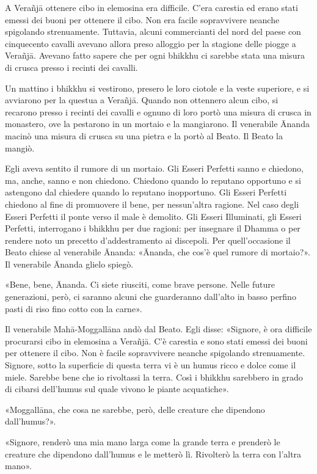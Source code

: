  A Verañjā ottenere cibo in elemosina era difficile. C’era
carestia ed erano stati emessi dei buoni per ottenere il cibo. Non era
facile sopravvivere neanche spigolando strenuamente. Tuttavia, alcuni
commercianti del nord del paese con cinquecento cavalli avevano allora
preso alloggio per la stagione delle piogge a Verañjā. Avevano fatto
sapere che per ogni bhikkhu ci sarebbe stata una misura di crusca presso
i recinti dei cavalli.


Un mattino i bhikkhu si vestirono, presero le loro ciotole e la veste
superiore, e si avviarono per la questua a Verañjā. Quando non ottennero
alcun cibo, si recarono presso i recinti dei cavalli e ognuno di loro
portò una misura di crusca in monastero, ove la pestarono in un mortaio
e la mangiarono. Il venerabile Ānanda macinò una misura di crusca su una
pietra e la portò al Beato. Il Beato la mangiò.


Egli aveva sentito il rumore di un mortaio. Gli Esseri Perfetti sanno e
chiedono, ma, anche, sanno e non chiedono. Chiedono quando lo reputano
opportuno e si astengono dal chiedere quando lo reputano inopportuno.
Gli Esseri Perfetti chiedono al fine di promuovere il bene, per
nessun’altra ragione. Nel caso degli Esseri Perfetti il ponte verso il
male è demolito. Gli Esseri Illuminati, gli Esseri Perfetti, interrogano
i bhikkhu per due ragioni: per insegnare il Dhamma o per rendere noto un
precetto d’addestramento ai discepoli. Per quell’occasione il Beato
chiese al venerabile Ānanda: «Ānanda, che cos’è quel rumore di
mortaio?». Il venerabile Ānanda glielo spiegò.


«Bene, bene, Ānanda. Ci siete riusciti, come brave persone. Nelle future
generazioni, però, ci saranno alcuni che guarderanno dall’alto in basso
perfino pasti di riso fino cotto con la carne».


Il venerabile Mahā-Moggallāna andò dal Beato. Egli disse: «Signore, è
ora difficile procurarsi cibo in elemosina a Verañjā. C’è carestia e
sono stati emessi dei buoni per ottenere il cibo. Non è facile
sopravvivere neanche spigolando strenuamente. Signore, sotto la
superficie di questa terra vi è un humus ricco e dolce come il miele.
Sarebbe bene che io rivoltassi la terra. Così i bhikkhu sarebbero in
grado di cibarsi dell’humus sul quale vivono le piante acquatiche».


«Moggallāna, che cosa ne sarebbe, però, delle creature che dipendono
dall’humus?».


«Signore, renderò una mia mano larga come la grande terra e prenderò le
creature che dipendono dall’humus e le metterò lì. Rivolterò la terra
con l’altra mano».


